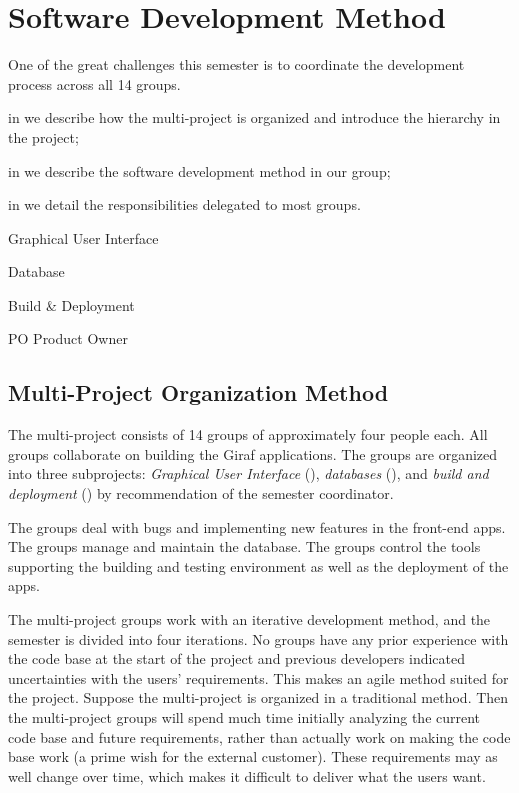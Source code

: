 \chapter{Software Development Method}\label{chap:sw_dev_method}
One of the great challenges this semester is to coordinate the development process across all 14 groups. 

\begin{chapterorganization}
  \item in  we describe how the multi-project is organized and introduce the hierarchy in the project;
  \item in  we describe the software development method in our group;
  \item in  we detail the responsibilities delegated to most groups.
\end{chapterorganization}

\begin{abbreviations}
  \item[\gui] Graphical User Interface
  \item[\db] Database
  \item[\bd] Build \& Deployment
  \item[PO] Product Owner
\end{abbreviations}

\section{Multi-Project Organization Method}\label{sec:project_overview}
The multi-project consists of 14 groups of approximately four people each. All groups collaborate on building the Giraf applications. The groups are organized into three subprojects: \emph{Graphical User Interface} (\gui), \emph{databases} (\db), and \emph{build and deployment} (\bd) by recommendation of the semester coordinator.

The \gui groups deal with bugs and implementing new features in the front-end apps. The \db groups manage and maintain the database. The \bd groups control the tools supporting the building and testing environment as well as the deployment of the apps.

The multi-project groups work with an iterative development method, and the semester is divided into four iterations. No groups have any prior experience with the code base at the start of the project and previous developers indicated uncertainties with the users' requirements. This makes an agile method suited for the project. Suppose the multi-project is organized in a traditional method. Then the multi-project groups will spend much time initially analyzing the current code base and future requirements, rather than actually work on making the code base work (a prime wish for the external customer). These requirements may as well change over time, which makes it difficult to deliver what the users want.

